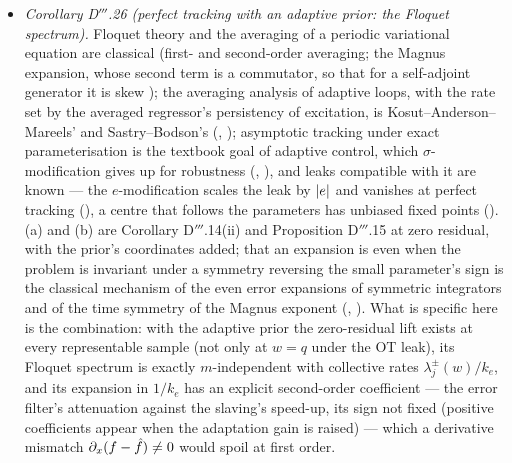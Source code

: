 \begin{itemize}
    the instance the law (B) is asymptotic (the exact floor 2.8 times it at $m = 15$), and the samples without an
    exact representation are not rare at small $m$ (0.36 at $m = 15$). Numerics: .
    Verdict: classical ingredients (the delta method, the Gauss--Newton spectrum, semi-relaxed transport, the
    filter-factor bound, the interpolation mechanism), new mechanism (the floor as the bias's slope, mode by mode, and
    its removal by a learned prior under regularisation) and a resolution of Remark D$'''$.10's bias--variance
    trade-off at the function level, at the price of the collective rate.
  \item \emph{Corollary D$'''$.26 (perfect tracking with an adaptive prior: the Floquet spectrum).} Floquet theory and
    the averaging of a periodic variational equation are classical (first- and second-order averaging; the Magnus
    expansion, whose second term is a commutator, so that for a self-adjoint generator it is skew \cite{S52}); the
    averaging analysis of adaptive loops, with the rate set by the averaged regressor's persistency of excitation, is
    Kosut--Anderson--Mareels' and Sastry--Bodson's (\cite{S52}, \cite{sb1989}); asymptotic tracking under exact
    parameterisation is the textbook goal of adaptive control, which $\sigma$-modification gives up for robustness
    (\cite{x-ioannou1983}, \cite{ioannou1996}), and leaks compatible with it are known --- the $e$-modification scales
    the leak by $\lvert e\rvert$ and vanishes at perfect tracking (\cite{S52}), a centre that follows the parameters has
    unbiased fixed points (\cite{S49}). (a) and (b) are Corollary D$'''$.14(ii) and Proposition D$'''$.15 at zero
    residual, with the prior's coordinates added; that an expansion is even when the problem is invariant under a
    symmetry reversing the small parameter's sign is the classical mechanism of the even error expansions of
    symmetric integrators and of the time symmetry of the Magnus exponent (\cite{S56}, \cite{S52}). What is specific
    here is the combination: with the adaptive prior the zero-residual lift exists at every representable sample (not
    only at $w = q$ under the OT leak), its Floquet spectrum is exactly $m$-independent with collective rates
    $\lambda_j^\pm(w)/k_e$, and its expansion in $1/k_e$ has an explicit second-order coefficient --- the error
    filter's attenuation against the slaving's speed-up, its sign not fixed (positive coefficients appear when the
    adaptation gain is raised) --- which a derivative mismatch $\partial_x(f - \hat f)\ne0$ would spoil at first order.

\end{itemize}
